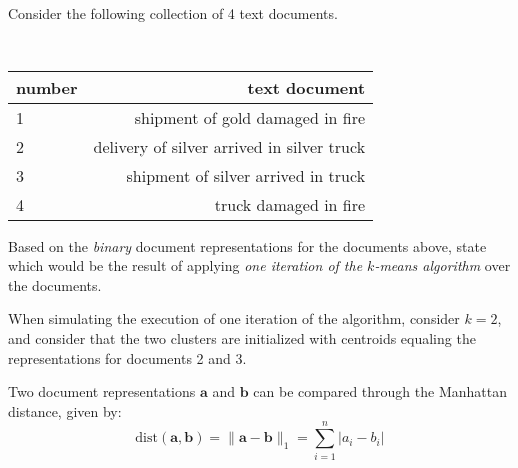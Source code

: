 \documentclass[12pt]{article}
\begin{document}
\subsection{}

Consider the following collection of 4 text documents.

\begin{center}
\tt
\begin{tabular}{ l r }
number & text document \\
\hline
\hline
1 & shipment of gold damaged in fire \\ \hline
2 & delivery of silver arrived in silver truck \\ \hline
3 & shipment of silver arrived in truck \\ \hline
4 & truck damaged in fire \\ \hline
\end{tabular}
\end{center}

Based on the \emph{binary} document representations for the documents above, state which would be the result of applying {\it one iteration of the $k$-means algorithm} over the documents. 

When simulating the execution of one iteration of the algorithm, consider $k=2$, and consider that the two clusters are initialized with centroids equaling the representations for documents 2 and 3.

Two document representations 
 $\mathbf{a}$ and $\mathbf{b}$ can be compared through the Manhattan distance, given by:
\begin{equation*}
\mathrm{dist}(\mathbf{a}, \mathbf{b}) = \|\mathbf{a} - \mathbf{b}\|_1 = \sum_{i=1}^n |a_i-b_i|
\end{equation*}
\end{document}
